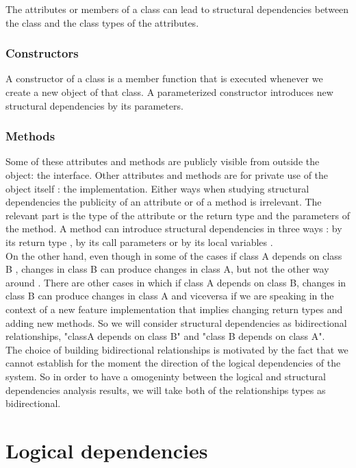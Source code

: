 The attributes or members of a class can lead to structural dependencies between the class and the class types of the attributes.

\subsubsection{Constructors}

A constructor of a class is a member function that is executed whenever we create a new object of that class.  A parameterized constructor introduces new structural dependencies by its parameters.

\subsubsection{Methods}

Some of these attributes and methods are publicly visible from outside the object:  the interface. Other
attributes and methods are for private use of the object itself : the implementation. Either ways when studying structural dependencies the publicity of an attribute or of a method is irrelevant. \cite{oopconcept} The relevant part is the type of the attribute or the return type and the parameters of the method. A method can introduce structural dependencies in three ways : by its return type , by its call parameters or by its local variables .\\

\tab On the other hand, even though in some of the cases if class A depends on class B , changes in class B can produce changes in class A, but not the other way around \cite{ct5} . There are other cases in which if class A depends on class B, changes in class B can produce changes in class A and viceversa if we are speaking in the context of a new feature implementation that implies changing return types and adding new methods. So we will consider structural dependencies as bidirectional relationships, "classA depends on class B" and "class B depends on class A".\\ \tab The choice of building bidirectional relationships is motivated by the fact that we cannot establish for the moment the direction of the logical dependencies of the system. So in order to have a omogeninty between the logical and structural dependencies analysis results, we will take both of the relationships types as bidirectional. 

\section{Logical dependencies}
